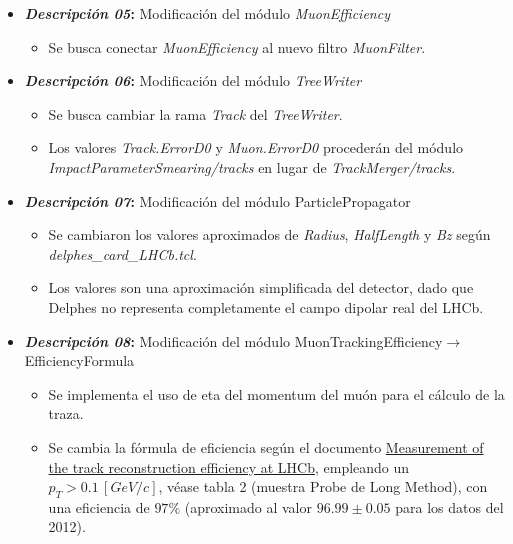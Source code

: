 \begin{itemize}
\begin{itemize}
\begin{itemize}
                \item El filtro se encarga de seleccionar $\abs{PID}=13$. De manera que los candidatos resultates conservan los parámetros D0, DZ, ErrorD0, ErrorDZ, PT, Etay Phi.
            \end{itemize}
            \item[$\divideontimes$] \textbf{\textit{Descripción 05}:} Modificación del módulo \textit{MuonEfficiency}
            \begin{itemize}
                \item Se busca conectar \textit{MuonEfficiency} al nuevo filtro \textit{MuonFilter}.
            \end{itemize}
            \item[$\divideontimes$] \textbf{\textit{Descripción 06}:} Modificación del módulo \textit{TreeWriter}
            \begin{itemize}
                \item Se busca cambiar la rama \textit{Track} del \textit{TreeWriter}.
                \item Los valores \textit{Track.ErrorD0} y \textit{Muon.ErrorD0} procederán del módulo \textit{ImpactParameterSmearing/tracks} en lugar de \textit{TrackMerger/tracks}.
            \end{itemize}
            \item[$\divideontimes$] \textbf{\textit{Descripción 07}:} Modificación del módulo ParticlePropagator
            \begin{itemize}
                \item Se cambiaron los valores aproximados de \textit{Radius}, \textit{HalfLength} y \textit{Bz} según \textit{delphes\_card\_LHCb.tcl}. 
                \item Los valores son una aproximación simplificada del detector, dado que Delphes no representa completamente el campo dipolar real del LHCb.
            \end{itemize}
            \item[$\divideontimes$] \textbf{\textit{Descripción 08}:} Modificación del módulo MuonTrackingEfficiency$\to$EfficiencyFormula
            \begin{itemize}
                \item Se implementa el uso de eta del momentum del muón para el cálculo de la traza.
                \item Se cambia la fórmula de eficiencia según el documento \href{https://iopscience.iop.org/article/10.1088/1748-0221/10/02/P02007}{Measurement of the track reconstruction efficiency at LHCb}, empleando un $p_{T}>0.1\,[GeV/c]$, véase tabla 2 (muestra Probe de Long Method), con una eficiencia de $97\%$ (aproximado al valor $96.99\pm0.05$ para los datos del 2012).

\end{itemize}
\end{itemize}
\end{itemize}
